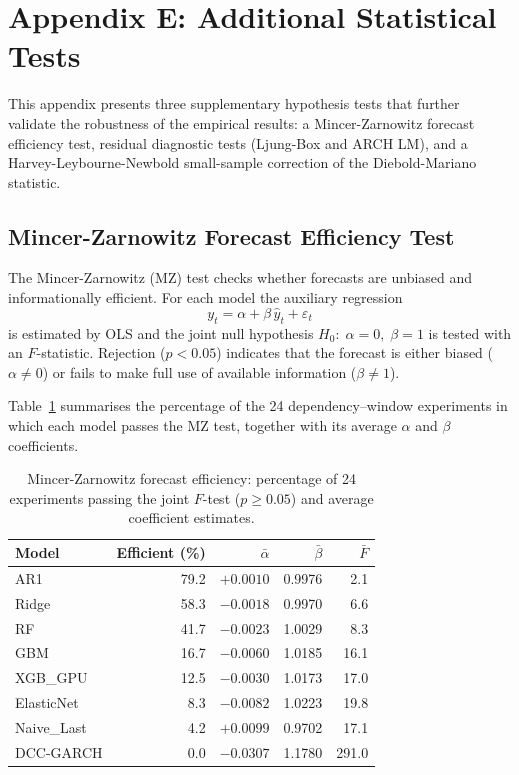 \section{Appendix E: Additional Statistical Tests}

This appendix presents three supplementary hypothesis tests that further
validate the robustness of the empirical results: a Mincer-Zarnowitz forecast
efficiency test, residual diagnostic tests (Ljung-Box and ARCH LM), and a
Harvey-Leybourne-Newbold small-sample correction of the Diebold-Mariano statistic.

\subsection{Mincer-Zarnowitz Forecast Efficiency Test}

The Mincer-Zarnowitz (MZ) test \cite{mincer1969economic} checks whether forecasts
are unbiased and informationally efficient.
For each model the auxiliary regression
\begin{equation}
    y_t = \alpha + \beta\,\hat{y}_t + \varepsilon_t
\end{equation}
is estimated by OLS and the joint null hypothesis $H_0{:}\;\alpha = 0,\;\beta = 1$
is tested with an $F$-statistic.
Rejection ($p < 0.05$) indicates that the forecast is either biased ($\alpha \neq 0$)
or fails to make full use of available information ($\beta \neq 1$).

Table~\ref{tab:mz_summary} summarises the percentage of the 24
dependency–window experiments in which each model passes the MZ test,
together with its average $\alpha$ and $\beta$ coefficients.

\begin{table}[H]
    \centering
    \caption{Mincer-Zarnowitz forecast efficiency: percentage of 24 experiments
             passing the joint $F$-test ($p \geq 0.05$) and average coefficient estimates.}
    \label{tab:mz_summary}
    \begin{tabular}{lrrrr}
        \toprule
        Model & Efficient (\%) & $\bar{\alpha}$ & $\bar{\beta}$ & $\bar{F}$ \\
        \midrule
        AR1         & 79.2 & $+0.0010$ & 0.9976 &   2.1 \\
        Ridge       & 58.3 & $-0.0018$ & 0.9970 &   6.6 \\
        RF          & 41.7 & $-0.0023$ & 1.0029 &   8.3 \\
        GBM         & 16.7 & $-0.0060$ & 1.0185 &  16.1 \\
        XGB\_GPU    & 12.5 & $-0.0030$ & 1.0173 &  17.0 \\
        ElasticNet  &  8.3 & $-0.0082$ & 1.0223 &  19.8 \\
        Naive\_Last &  4.2 & $+0.0099$ & 0.9702 &  17.1 \\
        DCC-GARCH   &  0.0 & $-0.0307$ & 1.1780 & 291.0 \\
        \bottomrule
    \end{tabular}
\end{table}

